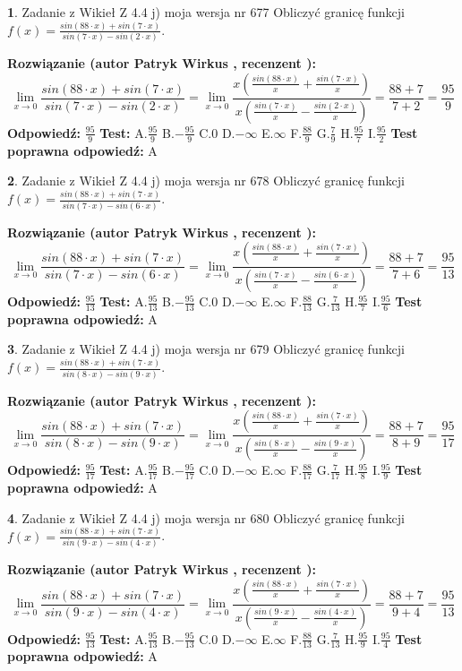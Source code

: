 \documentclass[12pt, a4paper]{article}
\theoremstyle{definition} %
\newtheorem{zad}{}
\newcommand{\zadStart}[1]{\begin{zad}#1\newline}
\newcommand{\zadStop}{\end{zad}}
\newcommand{\rozwStart}[2]{\noindent \textbf{Rozwiązanie (autor #1 , recenzent #2): }\newline}
\newcommand{\rozwStop}{\newline}
\newcommand{\odpStart}{\noindent \textbf{Odpowiedź:}\newline}
\newcommand{\odpStop}{\newline}
\newcommand{\testStart}{\noindent \textbf{Test:}\newline}
\newcommand{\testStop}{\newline}
\newcommand{\kluczStart}{\noindent \textbf{Test poprawna odpowiedź:}\newline}
\newcommand{\kluczStop}{\newline}
\begin{document}
\zadStart{Zadanie z Wikieł Z 4.4 j) moja wersja nr 677}
Obliczyć granicę funkcji $f(x)=\frac{sin(88\cdot x) +sin(7\cdot x)}{sin(7\cdot x) -sin(2\cdot x)}$.
\zadStop
\rozwStart{Patryk Wirkus}{}
$$\lim\limits_{x\to 0}\frac{sin(88\cdot x) +sin(7\cdot x)}{sin(7\cdot x) -sin(2\cdot x)}=\lim\limits_{x\to 0}\frac{x(\frac{sin(88\cdot x)}{x}+\frac{sin(7\cdot x)}{x})}{x(\frac{sin(7\cdot x)}{x}-\frac{sin(2\cdot x)}{x})}=\frac{88+7}{7+2} = \frac{95}{9}$$
\rozwStop
\odpStart
$\frac{95}{9}$
\odpStop
\testStart
A.$\frac{95}{9}$
B.$-\frac{95}{9}$
C.$0$
D.$-\infty$
E.$\infty$
F.$\frac{88}{9}$
G.$\frac{7}{9}$
H.$\frac{95}{7}$
I.$\frac{95}{2}$
\testStop
\kluczStart
A
\kluczStop



\zadStart{Zadanie z Wikieł Z 4.4 j) moja wersja nr 678}
Obliczyć granicę funkcji $f(x)=\frac{sin(88\cdot x) +sin(7\cdot x)}{sin(7\cdot x) -sin(6\cdot x)}$.
\zadStop
\rozwStart{Patryk Wirkus}{}
$$\lim\limits_{x\to 0}\frac{sin(88\cdot x) +sin(7\cdot x)}{sin(7\cdot x) -sin(6\cdot x)}=\lim\limits_{x\to 0}\frac{x(\frac{sin(88\cdot x)}{x}+\frac{sin(7\cdot x)}{x})}{x(\frac{sin(7\cdot x)}{x}-\frac{sin(6\cdot x)}{x})}=\frac{88+7}{7+6} = \frac{95}{13}$$
\rozwStop
\odpStart
$\frac{95}{13}$
\odpStop
\testStart
A.$\frac{95}{13}$
B.$-\frac{95}{13}$
C.$0$
D.$-\infty$
E.$\infty$
F.$\frac{88}{13}$
G.$\frac{7}{13}$
H.$\frac{95}{7}$
I.$\frac{95}{6}$
\testStop
\kluczStart
A
\kluczStop



\zadStart{Zadanie z Wikieł Z 4.4 j) moja wersja nr 679}
Obliczyć granicę funkcji $f(x)=\frac{sin(88\cdot x) +sin(7\cdot x)}{sin(8\cdot x) -sin(9\cdot x)}$.
\zadStop
\rozwStart{Patryk Wirkus}{}
$$\lim\limits_{x\to 0}\frac{sin(88\cdot x) +sin(7\cdot x)}{sin(8\cdot x) -sin(9\cdot x)}=\lim\limits_{x\to 0}\frac{x(\frac{sin(88\cdot x)}{x}+\frac{sin(7\cdot x)}{x})}{x(\frac{sin(8\cdot x)}{x}-\frac{sin(9\cdot x)}{x})}=\frac{88+7}{8+9} = \frac{95}{17}$$
\rozwStop
\odpStart
$\frac{95}{17}$
\odpStop
\testStart
A.$\frac{95}{17}$
B.$-\frac{95}{17}$
C.$0$
D.$-\infty$
E.$\infty$
F.$\frac{88}{17}$
G.$\frac{7}{17}$
H.$\frac{95}{8}$
I.$\frac{95}{9}$
\testStop
\kluczStart
A
\kluczStop



\zadStart{Zadanie z Wikieł Z 4.4 j) moja wersja nr 680}
Obliczyć granicę funkcji $f(x)=\frac{sin(88\cdot x) +sin(7\cdot x)}{sin(9\cdot x) -sin(4\cdot x)}$.
\zadStop
\rozwStart{Patryk Wirkus}{}
$$\lim\limits_{x\to 0}\frac{sin(88\cdot x) +sin(7\cdot x)}{sin(9\cdot x) -sin(4\cdot x)}=\lim\limits_{x\to 0}\frac{x(\frac{sin(88\cdot x)}{x}+\frac{sin(7\cdot x)}{x})}{x(\frac{sin(9\cdot x)}{x}-\frac{sin(4\cdot x)}{x})}=\frac{88+7}{9+4} = \frac{95}{13}$$
\rozwStop
\odpStart
$\frac{95}{13}$
\odpStop
\testStart
A.$\frac{95}{13}$
B.$-\frac{95}{13}$
C.$0$
D.$-\infty$
E.$\infty$
F.$\frac{88}{13}$
G.$\frac{7}{13}$
H.$\frac{95}{9}$
I.$\frac{95}{4}$
\testStop
\kluczStart
A
\kluczStop
\end{document}
